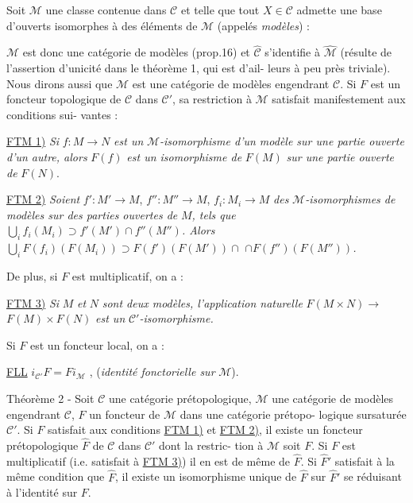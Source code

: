 Soit $\mathcal{M}$ une classe contenue dans $\mathcal{C}$ et telle que tout $X \in \mathcal{C}$ admette
une base d'ouverts isomorphes à des éléments de $\mathcal{M}$ (appelés \emph{modèles}) :

\newpage



$\mathcal{M}$ est donc une catégorie de modèles (prop.16) et $\hat{\mathcal{C}}$ s'identifie à
$\hat{\mathcal{M}}$ (résulte de l'assertion d'unicité dans le théorème 1, qui est d'ail-
leurs à peu près triviale). Nous dirons aussi que $\mathcal{M}$ est une catégorie
de modèles engendrant $\mathcal{C}$. Si $F$ est un foncteur topologique de $\mathcal{C}$ dans
$\mathcal{C}'$, sa restriction à $\mathcal{M}$ satisfait manifestement aux conditions sui-
vantes :

\underline{FTM 1)} \emph{Si} $f: M \to N$ \emph{est un} $\mathcal{M}$\emph{-isomorphisme d'un modèle sur une partie
ouverte d'un autre, alors} $F(f)$ \emph{est un isomorphisme de} $F(M)$ \emph{sur
une partie ouverte de} $F(N)$.

\underline{FTM 2)} \emph{Soient} $f': M' \to M$, $f'': M'' \to M$, $f_i: M_i \to M$ \emph{des} $\mathcal{M}$\emph{-isomorphismes
de modèles sur des parties ouvertes de} $M$\emph{, tels que
$\bigcup_i f_i(M_i) \supset f'(M') \cap f''(M'')$. Alors $\bigcup_i F(f_i)(F(M_i)) \supset F(f')(F(M')) \cap$
$\cap F(f'')(F(M''))$.}

De plus, si $F$ est multiplicatif, on a :

\underline{FTM 3)} \emph{Si} $M$ \emph{et} $N$ \emph{sont deux modèles, l'application naturelle} $F(M \times N) \to$
$F(M) \times F(N)$ \emph{est un} $\mathcal{C}'$\emph{-isomorphisme.}

Si $F$ est un foncteur local, on a :

\underline{FLL} \quad $i_{\mathcal{C}'} F = F i_{\mathcal{M}}$ , (\emph{identité fonctorielle sur} $\mathcal{M}$).

Théorème 2 - Soit $\mathcal{C}$ une catégorie prétopologique, $\mathcal{M}$ une catégorie de
modèles engendrant $\mathcal{C}$, $F$ un foncteur de $\mathcal{M}$ dans une catégorie prétopo-
logique sursaturée $\mathcal{C}'$. Si $F$ satisfait aux conditions \underline{FTM 1)} et \underline{FTM 2)},
il existe un foncteur prétopologique $\hat{F}$ de $\mathcal{C}$ dans $\mathcal{C}'$ dont la restric-
tion à $\mathcal{M}$ soit $F$. Si $F$ est multiplicatif (i.e. satisfait à \underline{FTM 3)}) il
en est de même de $\hat{F}$. Si $\hat{F}'$ satisfait à la même condition que $\hat{F}$, il
existe un isomorphisme unique de $\hat{F}$ sur $\hat{F}'$ se réduisant à l'identité
sur $F$.

